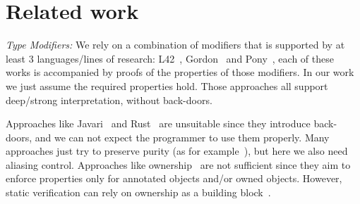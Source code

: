 
\saveSpace
\section{Related work}
\label{s:related}
\saveSpace

\noindent\textit{Type Modifiers:}
We rely on a combination of modifiers that is supported by at least 3 languages/lines of research:
L42~\cite{ServettoZucca15,ServettoEtAl13a,JOT:issue_2011_01/article1,GianniniEtAl16},
Gordon~\cite{GordonEtAl12}
and Pony~\cite{clebsch2015deny,clebsch2017orca},
each of these works is accompanied by proofs of the properties of those modifiers.
In our work we just assume the required properties hold.
 Those approaches all support deep/strong interpretation, without back-doors.

Approaches like Javari~\cite{TschantzErnst05,Boyland06} and Rust~\cite{matsakis2014rust}
are unsuitable since they introduce back-doors, and we can not expect the programmer to use them properly.
Many approaches just try to preserve purity (as for example~\cite{pearce2011jpure}),
but here we also need aliasing control.
Approaches like ownership~\cite{ClarkeEtAl13,ZibinEtAl10,DietlEtAl07}
are not sufficient since they aim to enforce properties only for
annotated objects and/or owned objects.
However, static verification can rely on ownership as a building block~\cite{%
muller2002modular,%
barnett2011specification%
}.%





